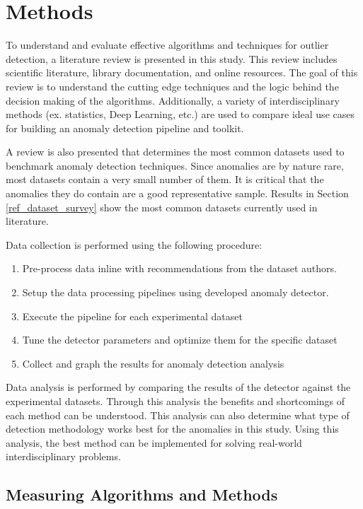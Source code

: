 \section{Methods}
\label{ref_methods}

To understand and evaluate effective algorithms and techniques for outlier detection, a literature review is presented in this study. This review includes scientific literature, library documentation, and online resources. The goal of this review is to understand the cutting edge techniques and the logic behind the decision making of the algorithms. Additionally, a variety of interdisciplinary methods (ex. statistics, Deep Learning, etc.) are used to compare ideal use cases for building an anomaly detection pipeline and toolkit.  

A review is also presented that determines the most common datasets used to benchmark anomaly detection techniques. Since anomalies are by nature rare, most datasets contain a very small number of them. It is critical that the anomalies they do contain are a good representative sample. Results in Section \ref{ref_dataset_survey} show the most common datasets currently used in literature.   

Data collection is performed using the following procedure:
\begin{enumerate}
    \item Pre-process data inline with recommendations from the dataset authors.
    \item Setup the data processing pipelines using developed anomaly detector.
    \item Execute the pipeline for each experimental dataset
    \item Tune the detector parameters and optimize them for the specific dataset
    \item Collect and graph the results for anomaly detection analysis
\end{enumerate}

Data  analysis is performed by comparing the results of the detector against the experimental datasets. Through this analysis the benefits and shortcomings of each method can be understood. This analysis can also determine what type of detection methodology works best for the anomalies in this study. Using this analysis, the best method can be implemented for solving real-world interdisciplinary problems.

\subsection{Measuring Algorithms and Methods}


